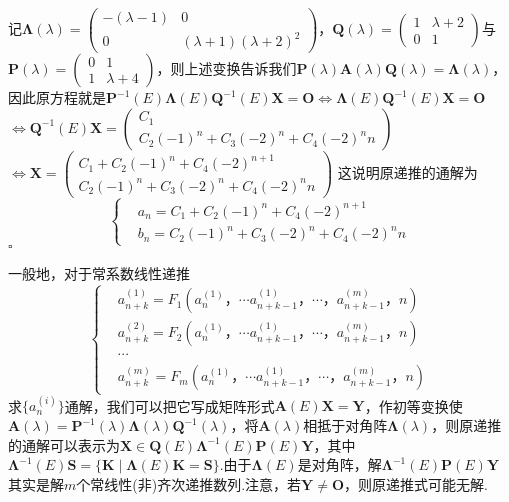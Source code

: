 \documentclass[10pt]{article}
\newcommand*{\QEDB}{\hfill\ensuremath{\square}}  %
\newcommand*{\D}{\text{，}}
\numberwithin{equation}{section}
\begin{document}
\begin{JT}
\[\begin{split}
\end{split}\]
记${\bm \Lambda}(\lambda) = \begin{pmatrix} -(\lambda-1) & 0 \\ 0 & (\lambda+1)(\lambda+2)^2 \end{pmatrix}$，${\bm Q}(\lambda)  =  \begin{pmatrix} 1 & \lambda+2 \\ 0 & 1 \end{pmatrix}$与${\bm P}(\lambda)  = \begin{pmatrix} 0 & 1 \\ 1 & \lambda+4\end{pmatrix}$，则上述变换告诉我们$\bm{P}(\lambda) \bm{A}(\lambda) \bm{Q}(\lambda) = \bm{\Lambda}(\lambda) $，因此原方程就是$\bm{P}^{-1}(E) \bm{\Lambda}(E) \bm{Q}^{-1}(E) \bm{X} = \bm{O}$$\Leftrightarrow \bm{\Lambda}(E) \bm{Q}^{-1}(E) \bm{X} = \bm{O}$$\Leftrightarrow \bm{Q}^{-1}(E) \bm{X} = \begin{pmatrix}C_1 \\ C_2(-1)^n + C_3(-2)^n + C_4(-2)^nn\end{pmatrix}$\\$ \Leftrightarrow \bm{X} = \begin{pmatrix}C_1 + C_2(-1)^n + C_4(-2)^{n+1} \\ C_2(-1)^n + C_3(-2)^n + C_4(-2)^nn \end{pmatrix}$
这说明原递推的通解为
\[
        \left\{
            \begin{aligned}
                &a_n = C_1 + C_2(-1)^n + C_4(-2)^{n+1} \\
                &b_n = C_2(-1)^n + C_3(-2)^n + C_4(-2)^nn
            \end{aligned}
        \right.
\]
\QEDB
\end{JT}
一般地，对于常系数线性递推
\[
        \left\{
            \begin{aligned}
                &a^{(1)}_{n+k} = F_1(a^{(1)}_n\D\cdots a^{(1)}_{n+k-1}\D\cdots\D a^{(m)}_{n+k-1}\D n)\\
                &a^{(2)}_{n+k} = F_2(a^{(1)}_n\D\cdots a^{(1)}_{n+k-1}\D\cdots\D a^{(m)}_{n+k-1}\D n)\\
                &\cdots \\
                &a^{(m)}_{n+k} = F_m(a^{(1)}_n\D\cdots a^{(1)}_{n+k-1}\D\cdots\D a^{(m)}_{n+k-1}\D n)
            \end{aligned}
        \right.
\]
求$\{a^{(i)}_n\}$通解，我们可以把它写成矩阵形式$\bm{A}(E)\bm{X} = \bm{Y}$，作初等变换使$\bm{A}(\lambda) = \bm{P}^{-1}(\lambda)\bm{\Lambda}(\lambda)\bm{Q}^{-1}(\lambda)$，将$\bm{A}(\lambda)$相抵于对角阵$\bm{\Lambda}{(\lambda)}$，则原递推的通解可以表示为$\bm{X} \in \bm{Q}(E)\bm{\Lambda}^{-1}(E)\bm{P}(E)\bm{Y}$，其中$\bm{\Lambda}^{-1}(E)\bm{S} = \{\bm{K} \mid \bm{\Lambda}(E)\bm{K} = \bm{S}\}$.由于$\bm{\Lambda}(E)$是对角阵，解$\bm{\Lambda}^{-1}(E)\bm{P}(E)\bm{Y}$其实是解$m$个常线性(非)齐次递推数列.注意，若$\bm{Y} \ne \bm{O}$，则原递推式可能无解.
\end{document}
